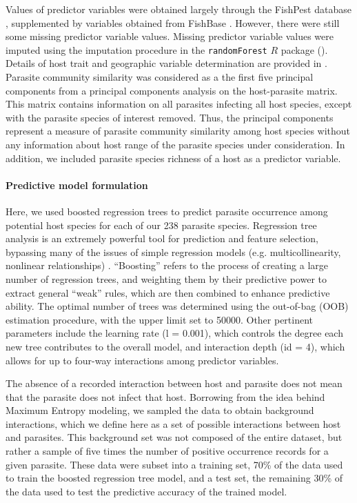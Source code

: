 \documentclass[12pt]{article}
\begin{document}
  Values of predictor variables were obtained largely through the FishPest database \cite{strona2012, strona2013}, supplemented by variables obtained from FishBase \cite{froese2010}. However, there were still some missing predictor variable values. Missing predictor variable values were imputed using the imputation procedure in the \texttt{randomForest} $R$ package (\cite{randomForest}). Details of host trait and geographic variable determination are provided in \cite{strona2013}. Parasite community similarity was considered as a the first five principal components from a principal components analysis on the host-parasite matrix. This matrix contains information on all parasites infecting all host species, except with the parasite species of interest removed. Thus, the principal components represent a measure of parasite community similarity among host species without any information about host range of the parasite species under consideration. In addition, we included parasite species richness of a host as a predictor variable.   
  
 
 \paragraph{Predictive model formulation}
  Here, we used boosted regression trees to predict parasite occurrence among potential host species for each of our 238 parasite species. Regression tree analysis is an extremely powerful tool for prediction and feature selection, bypassing many of the issues of simple regression models (e.g. multicollinearity, nonlinear relationships) \cite{elith2008, dallas2014}. “Boosting” refers to the process of creating a large number of regression trees, and weighting them by their predictive power to extract general “weak” rules, which are then combined to enhance predictive ability. The optimal number of trees was determined using the out-of-bag (OOB) estimation procedure, with the upper limit set to 50000. Other pertinent parameters include the learning rate (l = 0.001), which controls the degree each new tree contributes to the overall model, and interaction depth (id = 4), which allows for up to four-way interactions among predictor variables.
  
  The absence of a recorded interaction between host and parasite does not mean that the parasite does not infect that host. Borrowing from the idea behind Maximum Entropy modeling, we sampled the data to obtain background interactions, which we define here as a set of possible interactions between host and parasites. This background set was not composed of the entire dataset, but rather a sample of five times the number of positive occurrence records for a given parasite. These data were subset into a training set, 70\% of the data used to train the boosted regression tree model, and a test set, the remaining 30\% of the data used to test the predictive accuracy of the trained model.
  
\end{document}
